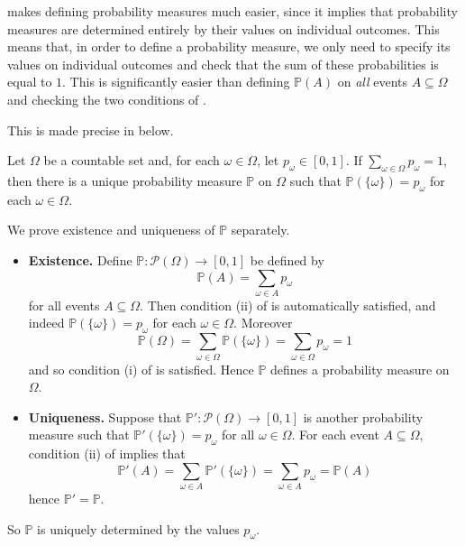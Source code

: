  makes defining probability measures much easier, since it implies that probability measures are determined entirely by their values on individual outcomes. This means that, in order to define a probability measure, we only need to specify its values on individual outcomes and check that the sum of these probabilities is equal to $1$. This is significantly easier than defining $\mathbb{P}(A)$ on \textit{all} events $A \subseteq \Omega$ and checking the two conditions of .

This is made precise in  below.

\begin{proposition}
\label{propProbabilityMeasureDeterminedByIndividualOutcomes}
Let $\Omega$ be a countable set and, for each $\omega \in \Omega$, let $p_{\omega} \in [0,1]$. If $\sum_{\omega \in \Omega} p_{\omega} = 1$, then there is a unique probability measure $\mathbb{P}$ on $\Omega$ such that $\mathbb{P}(\{ \omega \}) = p_{\omega}$ for each $\omega \in \Omega$.
\end{proposition}

\begin{cproof}
We prove existence and uniqueness of $\mathbb{P}$ separately.
\begin{itemize}
\item \textbf{Existence.} Define $\mathbb{P} : \mathcal{P}(\Omega) \to [0,1]$ be defined by
\[ \mathbb{P}(A) = \sum_{\omega \in A} p_{\omega} \]
for all events $A \subseteq \Omega$. Then condition (ii) of  is automatically satisfied, and indeed $\mathbb{P}(\{\omega\}) = p_{\omega}$ for each $\omega \in \Omega$. Moreover
\[ \mathbb{P}(\Omega) = \sum_{\omega \in \Omega} \mathbb{P}(\{\omega\}) = \sum_{\omega \in \Omega} p_{\omega} = 1 \]
and so condition (i) of  is satisfied. Hence $\mathbb{P}$ defines a probability measure on $\Omega$.
\item \textbf{Uniqueness.} Suppose that $\mathbb{P}' : \mathcal{P}(\Omega) \to [0,1]$ is another probability measure such that $\mathbb{P}'(\{\omega\})=p_{\omega}$ for all $\omega \in \Omega$. For each event $A \subseteq \Omega$, condition (ii) of  implies that
\[ \mathbb{P}'(A) = \sum_{\omega \in A} \mathbb{P}'(\{\omega\}) = \sum_{\omega \in A} p_{\omega} = \mathbb{P}(A) \]
hence $\mathbb{P}'=\mathbb{P}$.
\end{itemize}
So $\mathbb{P}$ is uniquely determined by the values $p_{\omega}$.
\end{cproof}


